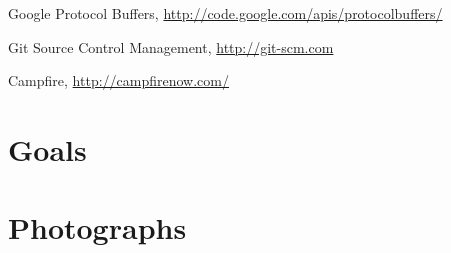 \documentclass[12pt, a4paper, titlepage]{article}
\begin{document}
\newpage

\setcounter{section}{5}
\begin{thebibliography}{9}

	Google Protocol Buffers,
	\url{http://code.google.com/apis/protocolbuffers/}

	Git Source Control Management,
	\url{http://git-scm.com}

	Campfire,
	\url{http://campfirenow.com/}

\end{thebibliography}

\appendix

\section{Goals}

\section{Photographs}
\end{document}
